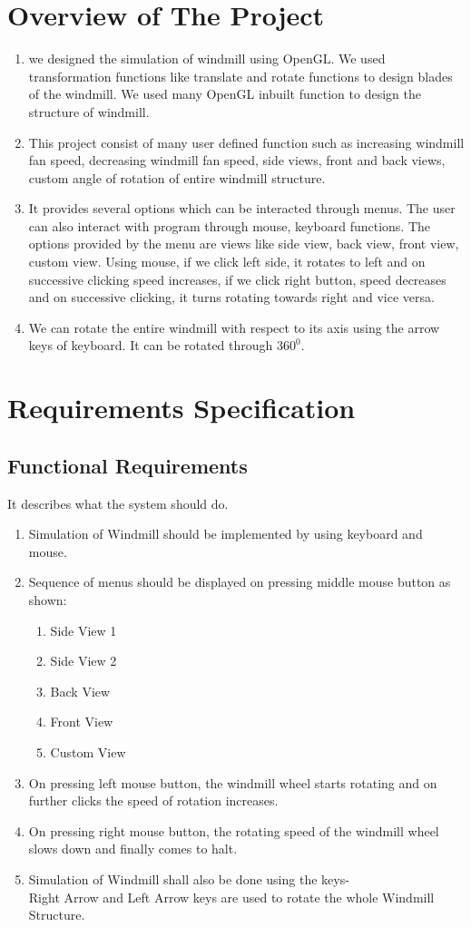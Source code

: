 \documentclass[fontsize=12pt]{article}
\begin{document}
\section{Overview of The Project}
\begin{enumerate}
\item we designed the simulation of windmill using OpenGL. We used transformation functions like translate and rotate functions to design blades of the windmill. We used many OpenGL inbuilt function to design the structure of windmill.
\item This project consist of many user defined function such as increasing windmill fan speed, decreasing windmill fan speed, side views, front and back views, custom angle of rotation of entire windmill structure.
\item It provides several options which can be interacted through menus. The user can also interact with program through mouse, keyboard functions. The options provided by the menu are views like side view, back view, front view, custom view. Using mouse, if we click left side, it rotates to left and on successive clicking speed increases, if we click right button, speed decreases and on successive clicking, it turns rotating towards right and vice versa.
\item We can rotate the entire windmill with respect to its axis using the arrow keys of keyboard. It can be rotated through $360^{0}$.
\end{enumerate}

\section{Requirements Specification}

\subsection{Functional Requirements}
It describes what the system should do.
\begin{enumerate}
\item Simulation of Windmill should be implemented by using keyboard and mouse.
\item Sequence of menus should be displayed on pressing middle mouse button as shown:
	\begin{enumerate}
		\item Side View 1
		\item Side View 2
		\item Back View
		\item Front View
		\item Custom View
	\end{enumerate}
\item On pressing left mouse button, the windmill wheel starts rotating and on further clicks the speed of rotation increases.
\item On pressing right mouse button, the rotating speed of the windmill wheel slows down and finally comes to halt. 
\item Simulation of Windmill shall also be done using the keys-\\
 Right Arrow and Left Arrow keys are used to rotate the whole Windmill Structure.
\end{enumerate}
\end{document}
